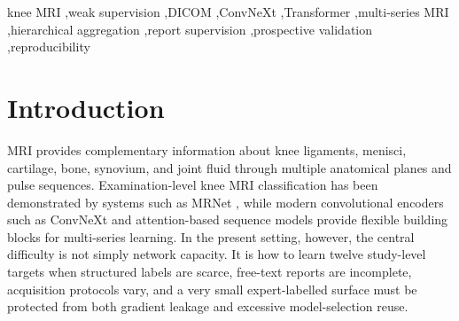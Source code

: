 \documentclass[preprint,12pt]{elsarticle}
\begin{document}
\begin{frontmatter}
\begin{abstract}
\begin{small}
{\em Solution method:} CNN\_CPC validates metadata, repairs missing series descriptors from DICOM headers when needed, orders slices spatially, constructs distributed 2.5D triplets, encodes them with ConvNeXt-Tiny, pools sixteen slice tokens to one series token, integrates all eligible real series with a study-level Transformer, and predicts twelve pathologies with learned queries. Reports are used only to create training supervision or representation-alignment targets; final prediction is MRI-only. \\

{\em Restrictions and unusual features:} Expert-labelled studies are excluded from weak-training gradients. The 58-study expert surface is explicitly treated as repeatedly reused development evidence. PV1 is a prospective weak-label architecture-selection surface and is valid only for downstream comparisons that share the exact frozen B16 encoder. CNN\_CPC is research software and is not a clinical diagnostic device.
\end{small}
\end{abstract}

\begin{keyword}
knee MRI \sep weak supervision \sep DICOM \sep ConvNeXt \sep Transformer \sep multi-series MRI \sep hierarchical aggregation \sep report supervision \sep prospective validation \sep reproducibility
\end{keyword}

\end{frontmatter}

\section{Introduction}
\label{sec:introduction}

MRI provides complementary information about knee ligaments, menisci, cartilage, bone, synovium, and joint fluid through multiple anatomical planes and pulse sequences. Examination-level knee MRI classification has been demonstrated by systems such as MRNet \cite{bien2018mrnet}, while modern convolutional encoders such as ConvNeXt \cite{liu2022convnext} and attention-based sequence models \cite{vaswani2017attention} provide flexible building blocks for multi-series learning. In the present setting, however, the central difficulty is not simply network capacity. It is how to learn twelve study-level targets when structured labels are scarce, free-text reports are incomplete, acquisition protocols vary, and a very small expert-labelled surface must be protected from both gradient leakage and excessive model-selection reuse.
\end{document}
